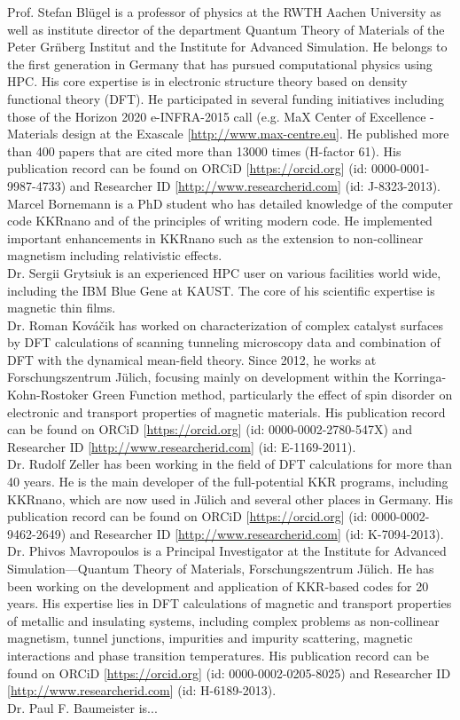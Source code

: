 \documentclass [a4paper, 12pt]{article}
\begin{document}
Prof. Stefan Bl{\"u}gel is a professor of physics at the RWTH Aachen University as well as 
institute director of the department Quantum Theory of Materials of the 
Peter Gr\"nberg Institut and the Institute for Advanced Simulation. 
He belongs to the first generation in Germany that has pursued computational physics 
using HPC. His core expertise is in electronic structure 
theory based on density functional theory (DFT).
He participated in several funding initiatives including those of the 
Horizon 2020 e-INFRA-2015 call
(e.g. MaX Center of Excellence - Materials design at the Exascale [\url{http://www.max-centre.eu}].
He published more than 400 papers that are cited more than 13000 times (H-factor 61).
His publication record can be found on ORCiD [\url{https://orcid.org}] (id: 0000-0001-9987-4733) 
and Researcher ID
[\url{http://www.researcherid.com}] (id: J-8323-2013).
\\
Marcel Bornemann is a PhD student who has
detailed knowledge of the computer code KKRnano and of the principles of writing modern code. 
He implemented important enhancements in KKRnano such as the extension to non-collinear
magnetism including relativistic effects.
\\
Dr. Sergii Grytsiuk is
an experienced HPC user on various facilities world wide, including the IBM Blue Gene at KAUST. 
The core of his scientific expertise is magnetic thin films. 
\\
Dr. Roman Kováčik has worked on characterization of complex catalyst surfaces 
by DFT calculations of scanning tunneling 
microscopy data and combination of DFT with the dynamical mean-field 
theory. Since 2012, he works at Forschungszentrum J\"ulich, focusing mainly on
development within the Korringa-Kohn-Rostoker Green Function method, 
particularly the effect of spin disorder on electronic and transport properties 
of magnetic materials. His publication record can be found on ORCiD 
[\url{https://orcid.org}] (id: 0000-0002-2780-547X) and Researcher ID 
[\url{http://www.researcherid.com}] (id: E-1169-2011).
\\
Dr. Rudolf Zeller has been working in the field of DFT calculations for more than 40 years. 
He is the main developer of the full-potential KKR programs, including KKRnano, 
which are now used in J{\"u}lich and several other places in Germany.
His publication record can be found on ORCiD [\url{https://orcid.org}] (id: 0000-0002-9462-2649) 
and Researcher ID
[\url{http://www.researcherid.com}] (id: K-7094-2013).
\\
Dr. Phivos Mavropoulos is a Principal Investigator at the Institute for Advanced Simulation—Quantum
Theory of Materials, Forschungszentrum J\"ulich.
He has been working on the development and application of KKR-based codes for 20 years. 
His expertise lies in DFT calculations of magnetic and transport
properties of metallic and insulating systems, including complex problems as non-collinear magnetism, 
tunnel junctions, impurities and impurity scattering, magnetic interactions and phase transition temperatures.
His publication record can be found on ORCiD [\url{https://orcid.org}] (id: 0000-0002-0205-8025) 
and Researcher ID
[\url{http://www.researcherid.com}] (id: H-6189-2013).
\\
Dr. Paul F. Baumeister is...
\end{document}
